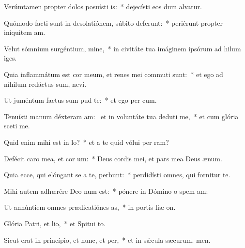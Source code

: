 \item Verúmtamen propter dolos posuísti is:~* dejecísti eos dum alvatur.
\item Quómodo facti sunt in desolatiónem, súbito deferunt:~* periérunt propter iniquitem am.
\item Velut sómnium surgéntium, mine,~* in civitáte tua imáginem ipsórum ad hilum iges.
\item Quia inflammátum est cor meum, et renes mei commuti sunt:~* et ego ad níhilum redáctus sum,  nevi.
\item Ut juméntum factus sum pud te:~* et ego per cum.
\item Tenuísti manum déxteram am:~\pscross{} et in voluntáte tua deduti me,~* et cum glória sceti me.
\item Quid enim mihi est in lo?~* et a te quid vólui per ram?
\item Defécit caro mea, et cor um:~* Deus cordis mei, et pars mea Deus  ænum.
\item Quia ecce, qui elóngant se a te, perbunt:~* perdidísti omnes, qui fornitur  te.
\item Mihi autem adhærére Deo num est:~* pónere in Dómino o spem am:
\item Ut annúntiem omnes prædicatiónes as,~* in portis liæ on.
\item Glória Patri, et lio,~* et Spitui to.
\item Sicut erat in princípio, et nunc, et per,~* et in sǽcula sæcurum. men.
